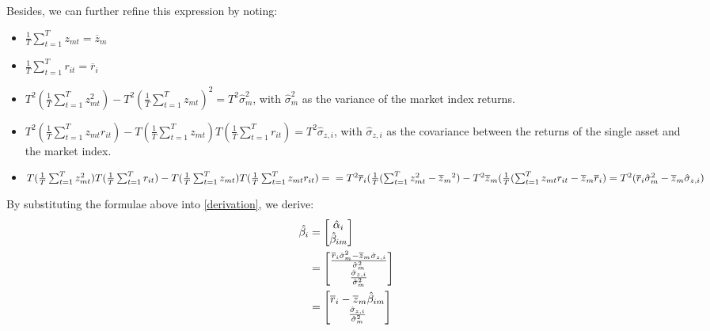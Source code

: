 \documentclass[]{article}
\begin{document}
Besides, we can further refine this expression by noting:
\begin{itemize}
	\item $\frac{1}{T}\sum_{t=1}^{T}z_{mt} =\overline{z}_m $
	\item $\frac{1}{T}\sum_{t=1}^{T}r_{it} =\overline{r}_i $
	\item $T^2(\frac{1}{T}\sum_{t=1}^{T}z_{mt}^2)-T^2(\frac{1}{T}\sum_{t=1}^{T}z_{mt})^2 = T^2\hat{\sigma}_{m}^2 $, with $\hat{\sigma}_{m}^2$ as the variance of the market index returns.
	\item $T^2(\frac{1}{T}\sum_{t=1}^{T}z_{mt}r_{it}) - T(\frac{1}{T}\sum_{t=1}^{T}z_{mt}) T(\frac{1}{T}\sum_{t=1}^{T}r_{it}) = T^2\hat{\sigma}_{z,i}$, with $\hat{\sigma}_{z,i} $ as the covariance between the returns of the single asset and the market index.
	\item $T(\frac{1}{T}\sum_{t=1}^{T}z_{mt}^2) T(\frac{1}{T}\sum_{t=1}^{T}r_{it}) - T(\frac{1}{T}\sum_{t=1}^{T}z_{mt})T(\frac{1}{T}\sum_{t=1}^{T}z_{mt}r_{it}) = \\ 
	= T^2\overline{r}_i(\frac{1}{T}(\sum_{t=1}^{T}z_{mt}^2-\overline{z}_m{^2})- T^2\overline{z}_m(\frac{1}{T}(\sum_{t=1}^{T}z_{mt}r_{it}-\overline{z}_m\overline{r}_i) \\
	= T^2(\overline{r}_i\hat{\sigma}_{m}^2 -\overline{z}_m\hat{\sigma}_{z,i})$
\end{itemize}
By substituting the formulae above into \ref{derivation}, we derive:
\begin{align}
	\hat{\beta_i} &= \begin{bmatrix} \hat{\alpha}_i \\ \hat{\beta}_{im} \end{bmatrix} \notag \\
	&= \begin{bmatrix} \frac{\overline{r}_i\hat{\sigma}_{m}^2-\overline{z}_m\hat{\sigma}_{z,i}}{\hat{\sigma}_{m}^2} \\ \frac{\hat{\sigma}_{z,i}}{\hat{\sigma}_{m}^2} \end{bmatrix} \notag \\
	&= \begin{bmatrix} \overline{r}_i - \overline{z}_m\hat{\beta}_{im} \\ \frac{\hat{\sigma}_{z,i}}{\hat{\sigma}_{m}^2} \end{bmatrix}
\end{align}
\end{document}
